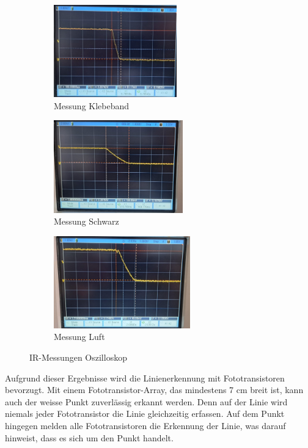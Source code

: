 \documentclass[../main.tex]{subfiles}
\begin{document}
\begin{figure}[htbp]
    \raggedright
    \begin{subfigure}[b]{0.3\textwidth}
        \includegraphics[height=4cm]{img/sensortest/IR_Klebeband.jpg}
        \caption{Messung Klebeband}
        \label{fig:IR_Klebeband}
    \end{subfigure}
    \hspace{0.2cm}  %
    \begin{subfigure}[b]{0.3\textwidth}
        \includegraphics[height=4cm]{img/sensortest/IR_Schwarz.jpg}
        \caption{Messung Schwarz}
        \label{fig:IR_Schwarz}
    \end{subfigure}
    \hspace{0.5cm}  %
    \begin{subfigure}[b]{0.3\textwidth}
        \includegraphics[height=4cm]{img/sensortest/IR_Luft.jpg}
        \caption{Messung Luft}
        \label{fig:IR_Luft}
    \end{subfigure}
    \caption{IR-Messungen Oszilloskop}
    \label{fig:IR_Messungen}
\end{figure}

Aufgrund dieser Ergebnisse wird die Linienerkennung mit Fototransistoren bevorzugt. Mit einem Fototransistor-Array, das mindestens 7 cm breit ist, kann auch der weisse Punkt zuverlässig erkannt werden. Denn auf der Linie wird niemals jeder Fototransistor die Linie gleichzeitig erfassen. Auf dem Punkt hingegen melden alle Fototransistoren die Erkennung der Linie, was darauf hinweist, dass es sich um den Punkt handelt.
\end{document}
